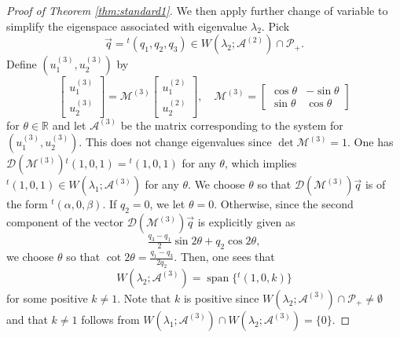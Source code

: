 \documentclass[11pt,a4paper,twosides]{amsart}
\theoremstyle{plain}
\theoremstyle{remark}
\numberwithin{equation}{section}
\newcommand{\R}{\mathbb{R}}
\DeclareMathOperator{\Span}{span}
\theoremstyle{definition}
\newcommand{\1}{{\bf 1}_{\{|x| < |t|\}}}
\begin{document}
\begin{proof}[Proof of Theorem \ref{thm:standard1}]
We then apply further change of variable to simplify the eigenspace associated with eigenvalue $\lambda_2$.
Pick
\[
	\vec{q} = {}^t\!( q_{1} ,
	q_{2}, q_{3})
\in W(\lambda_2;\mathscr{A}^{(2)}) \cap \mathcal{P}_+.
\]
Define $(u_1^{(3)},u_2^{(3)})$ by
\[
	\begin{bmatrix}
	u_1^{(3)}\\
	u_2^{(3)}
	\end{bmatrix}
	=
	\mathscr{M}^{(3)}
	\begin{bmatrix}
	u_1^{(2)}\\
	u_2^{(2)}
	\end{bmatrix}, \quad
	\mathscr{M}^{(3)}=\begin{bmatrix}
	\cos \theta & -\sin \theta \\
	\sin \theta & \cos \theta
	\end{bmatrix}
\]
for $\theta \in \R$ and 
let $\mathscr{A}^{(3)}$ be the matrix corresponding to the system for $(u_1^{(3)},u_2^{(3)})$. 
This does not change eigenvalues since $\det \mathscr{M}^{(3)}=1$.
One has $\mathscr{D}(\mathscr{M}^{(3)}){}^t\!(1,0,1)={}^t\!(1,0,1)$
 for any $\theta$, which implies
${}^t\!(1,0,1) \in W(\lambda_1;\mathscr{A}^{(3)})$ for any $\theta$. 
We choose $\theta$ so that
$\mathscr{D}(\mathscr{M}^{(3)})\vec{q}$ is of the form ${}^t\!(\alpha,0,\beta)$.
If $q_2=0$, we let $\theta=0$.
Otherwise, since the second component of the vector $\mathscr{D}(\mathscr{M}^{(3)})\vec{q}$ is explicitly given as
\[
	\tfrac{q_3-q_1}{2} \sin 2\theta + q_2 \cos 2 \theta ,
\]
we choose $\theta$ so that $\cot 2\theta = \frac{q_1-q_3}{2q_2}$.
Then, one sees that 
\[
	W(\lambda_2 ;\mathscr{A}^{(3)}) =\Span
	\{ {}^t\!(1,0,k) \}
\]
for some positive $k \neq 1$.
Note that $k$ is positive since
$W(\lambda_2;\mathscr{A}^{(3)}) \cap \mathcal{P}_+ \neq \emptyset$ and that $k\neq1$ follows from $W(\lambda_1;\mathscr{A}^{(3)}) \cap W(\lambda_2;\mathscr{A}^{(3)}) = \{0\}$.


\end{proof}
\end{document}

